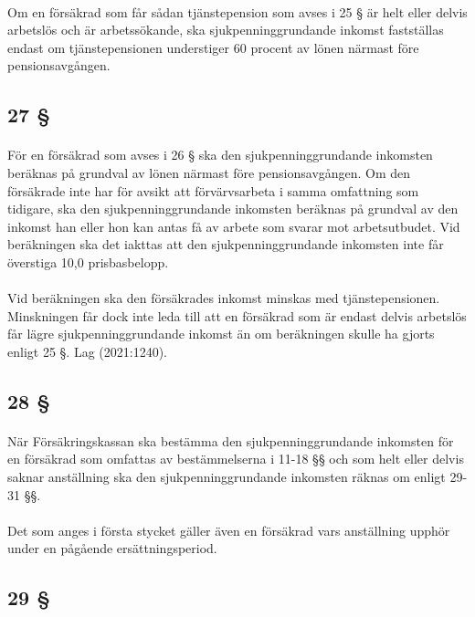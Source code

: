 \documentclass[a4paper,notitlepage,openany,10pt]{book}
\begin{document}
\paragraph*{}
Om en försäkrad som får sådan tjänstepension som avses i 25 § är helt eller delvis arbetslös och är arbetssökande, ska sjukpenninggrundande inkomst fastställas endast om tjänstepensionen understiger 60 procent av lönen närmast före pensionsavgången.
\subsection*{27 §}
\paragraph*{}
För en försäkrad som avses i 26 § ska den sjukpenninggrundande inkomsten beräknas på grundval av lönen närmast före pensionsavgången. Om den försäkrade inte har för avsikt att förvärvsarbeta i samma omfattning som tidigare, ska den sjukpenninggrundande inkomsten beräknas på grundval av den inkomst han eller hon kan antas få av arbete som svarar mot arbetsutbudet. Vid beräkningen ska det iakttas att den sjukpenninggrundande inkomsten inte får överstiga 10,0 prisbasbelopp.
\paragraph*{}
Vid beräkningen ska den försäkrades inkomst minskas med tjänstepensionen. Minskningen får dock inte leda till att en försäkrad som är endast delvis arbetslös får lägre sjukpenninggrundande inkomst än om beräkningen skulle ha gjorts enligt 25 §.
Lag (2021:1240).
\subsection*{28 §}
\paragraph*{}
När Försäkringskassan ska bestämma den sjukpenninggrundande inkomsten för en försäkrad som omfattas av bestämmelserna i 11-18 §§ och som helt eller delvis saknar anställning ska den sjukpenninggrundande inkomsten räknas om enligt 29-31 §§.
\paragraph*{}
Det som anges i första stycket gäller även en försäkrad vars anställning upphör under en pågående ersättningsperiod.
\subsection*{29 §}
\end{document}
